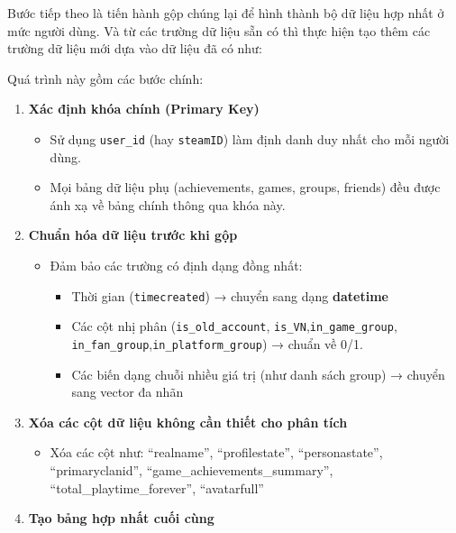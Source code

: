 \documentclass[
  11pt,
]{article}
\providecommand{\tightlist}{%
  \setlength{\itemsep}{0pt}\setlength{\parskip}{0pt}}
\begin{document}
Bước tiếp theo là tiến hành gộp chúng lại để hình thành bộ dữ liệu hợp
nhất ở mức người dùng. Và từ các trường dữ liệu sẵn có thì thực hiện tạo
thêm các trường dữ liệu mới dựa vào dữ liệu đã có như:

Quá trình này gồm các bước chính:

\begin{enumerate}
\def\labelenumi{\arabic{enumi}.}
\tightlist
\item
  \textbf{Xác định khóa chính (Primary Key)}

  \begin{itemize}
  \tightlist
  \item
    Sử dụng \texttt{user\_id} (hay \texttt{steamID}) làm định danh duy
    nhất cho mỗi người dùng.\\
  \item
    Mọi bảng dữ liệu phụ (achievements, games, groups, friends) đều được
    ánh xạ về bảng chính thông qua khóa này.
  \end{itemize}
\item
  \textbf{Chuẩn hóa dữ liệu trước khi gộp}

  \begin{itemize}
  \tightlist
  \item
    Đảm bảo các trường có định dạng đồng nhất:

    \begin{itemize}
    \tightlist
    \item
      Thời gian (\texttt{timecreated}) → chuyển sang dạng
      \textbf{datetime}
    \item
      Các cột nhị phân (\texttt{is\_old\_account},
      \texttt{is\_VN},\texttt{in\_game\_group},
      \texttt{in\_fan\_group},\texttt{in\_platform\_group}) → chuẩn về
      0/1.\\
    \item
      Các biến dạng chuỗi nhiều giá trị (như danh sách group) → chuyển
      sang vector đa nhãn
    \end{itemize}
  \end{itemize}
\item
  \textbf{Xóa các cột dữ liệu không cần thiết cho phân tích }

  \begin{itemize}
  \tightlist
  \item
    Xóa các cột như: ``realname'', ``profilestate'', ``personastate'',
    ``primaryclanid'', ``game\_achievements\_summary'',
    ``total\_playtime\_forever'', ``avatarfull''
  \end{itemize}
\item
  \textbf{Tạo bảng hợp nhất cuối cùng}


\end{enumerate}
\end{document}
